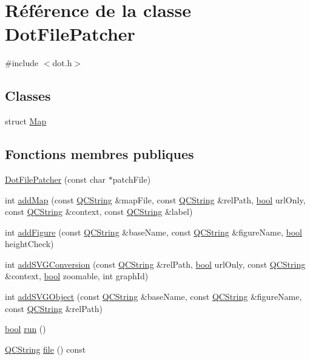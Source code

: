 \hypertarget{class_dot_file_patcher}{}\section{Référence de la classe Dot\+File\+Patcher}
\label{class_dot_file_patcher}


{\ttfamily \#include $<$dot.\+h$>$}

\subsection*{Classes}
\begin{DoxyCompactItemize}
\item 
struct \hyperlink{struct_dot_file_patcher_1_1_map}{Map}
\end{DoxyCompactItemize}
\subsection*{Fonctions membres publiques}
\begin{DoxyCompactItemize}
\item 
\hyperlink{class_dot_file_patcher_aaf02acecacecc1482f18bfaf154ec3aa}{Dot\+File\+Patcher} (const char $\ast$patch\+File)
\item 
int \hyperlink{class_dot_file_patcher_aa53ad66e5d0c6a04f6d198aa030b63f3}{add\+Map} (const \hyperlink{class_q_c_string}{Q\+C\+String} \&map\+File, const \hyperlink{class_q_c_string}{Q\+C\+String} \&rel\+Path, \hyperlink{qglobal_8h_a1062901a7428fdd9c7f180f5e01ea056}{bool} url\+Only, const \hyperlink{class_q_c_string}{Q\+C\+String} \&context, const \hyperlink{class_q_c_string}{Q\+C\+String} \&label)
\item 
int \hyperlink{class_dot_file_patcher_af67aa4441f3e872f6d3c69667572c052}{add\+Figure} (const \hyperlink{class_q_c_string}{Q\+C\+String} \&base\+Name, const \hyperlink{class_q_c_string}{Q\+C\+String} \&figure\+Name, \hyperlink{qglobal_8h_a1062901a7428fdd9c7f180f5e01ea056}{bool} height\+Check)
\item 
int \hyperlink{class_dot_file_patcher_aac97171a3985fd07e09fef2a25819a16}{add\+S\+V\+G\+Conversion} (const \hyperlink{class_q_c_string}{Q\+C\+String} \&rel\+Path, \hyperlink{qglobal_8h_a1062901a7428fdd9c7f180f5e01ea056}{bool} url\+Only, const \hyperlink{class_q_c_string}{Q\+C\+String} \&context, \hyperlink{qglobal_8h_a1062901a7428fdd9c7f180f5e01ea056}{bool} zoomable, int graph\+Id)
\item 
int \hyperlink{class_dot_file_patcher_a8a0183f93570ac3b1a8df3e0f7229a2b}{add\+S\+V\+G\+Object} (const \hyperlink{class_q_c_string}{Q\+C\+String} \&base\+Name, const \hyperlink{class_q_c_string}{Q\+C\+String} \&figure\+Name, const \hyperlink{class_q_c_string}{Q\+C\+String} \&rel\+Path)
\item 
\hyperlink{qglobal_8h_a1062901a7428fdd9c7f180f5e01ea056}{bool} \hyperlink{class_dot_file_patcher_a659e502ffc3ddcf46e1f53820ee5926e}{run} ()
\item 
\hyperlink{class_q_c_string}{Q\+C\+String} \hyperlink{class_dot_file_patcher_a4a23a9a5cdb7f82892685f1d062de564}{file} () const 
\end{DoxyCompactItemize}


